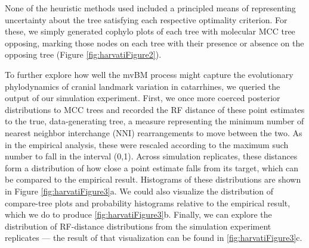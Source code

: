 \documentclass[10pt, twocolumn, twoside]{article}
\begin{document}
None of the heuristic methods used included a principled means of representing uncertainty about the tree satisfying each respective optimality criterion. For these, we simply generated cophylo plots of each tree with molecular MCC tree opposing, marking those nodes on each tree with their presence or absence on the opposing tree (Figure \ref{fig:harvatiFigure2}). 




To further explore how well the mvBM process might capture the evolutionary phylodynamics of cranial landmark variation in catarrhines, we queried the output of our simulation experiment. First, we once more coerced posterior distributions to MCC trees and recorded the RF distance of these point estimates to the true, data-generating tree, a measure representing the minimum number of nearest neighbor interchange (NNI) rearrangements to move between the two. As in the empirical analysis, these were rescaled according to the maximum such number to fall in the interval (0,1). Across simulation replicates, these distances form a distribution of how close a point estimate falls from its target, which can be compared to the empirical result. Histograms of these distributions are shown in Figure \ref{fig:harvatiFigure3}a. We could also visualize the distribution of compare-tree plots and probability histograms relative to the empirical result, which we do to produce \ref{fig:harvatiFigure3}b. Finally, we can explore the distribution of RF-distance distributions from the simulation experiment replicates --- the result of that visualization can be found in \ref{fig:harvatiFigure3}c. 
\end{document}
